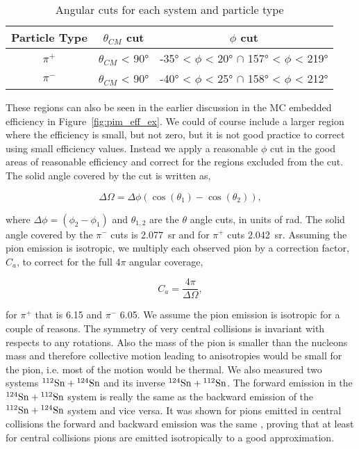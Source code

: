  \begin{table*}[!htb]
 \centering
{}
\begin{tabular}{@{}ccc@{}}\toprule 
Particle Type & $\theta_{CM}$ cut & $\phi$ cut  \\ [0.5ex] 
 \midrule
$\pi^+$  & $\theta_{CM}$ < \ang{90}   &  \ang{-35} < $\phi$ < \ang{20} $\cap$ \ang{157} < $\phi$ < \ang{219}  \\
$\pi^-$  & $\theta_{CM}$ < \ang{90}   &  \ang{-40} < $\phi$ < \ang{25} $\cap$ \ang{158} < $\phi$ < \ang{212}   \\
 \bottomrule
\end{tabular}
\caption{Angular cuts for each system and particle type}
\label{tb:anglecuts}
\end{table*}



These regions can also be seen in the earlier discussion in the MC embedded efficiency in Figure~\ref{fig:pim_eff_ex}.  We could of course include a larger region where the efficiency is small, but not zero, but it is not good practice to  correct using small efficiency values. Instead we apply a reasonable $\phi$ cut in the good areas of reasonable efficiency and correct for the regions excluded from the cut. The solid angle covered by the cut is written as,

\begin{equation}
\Delta\Omega = \Delta\phi(\cos(\theta_1) - \cos(\theta_2)),
\end{equation}

where $\Delta\phi = (\phi_2 - \phi_1)$  and $\theta_{1,2}$ are the $\theta$ angle cuts, in units of \si{\radian}. The solid angle covered by the $\pi^-$ cuts is \SI{2.077}{\steradian} and for $\pi^+$ cuts \SI{2.042}{\steradian}. Assuming the pion emission is isotropic, we multiply each observed pion by a correction factor, $C_a$, to correct for the full 4$\pi$ angular coverage, 

\begin{equation}
C_a = \frac{4\pi}{\Delta\Omega},
\label{eq:acceptCorrFactor}
\end{equation}

for $\pi^+$ that is \num{6.15} and $\pi^-$ \num{6.05}. We assume the pion emission is isotropic for a couple of reasons. The symmetry of very central collisions is invariant with respects to any rotations. Also the mass of the pion is smaller than the nucleons mass and therefore collective motion leading to anisotropies would be small for the pion, i.e. most of the motion would be thermal. We also measured two systems ${}^{112}\mathrm{Sn} + {}^{124}\mathrm{Sn}$ and its inverse ${}^{124}\mathrm{Sn} + {}^{112}\mathrm{Sn}$. The forward emission in the ${}^{124}\mathrm{Sn} + {}^{112}\mathrm{Sn}$ system is really the same as the backward emission of the ${}^{112}\mathrm{Sn} + {}^{124}\mathrm{Sn}$ system and vice versa. It was shown for pions emitted in central collisions the forward and backward emission was the same \cite{jon}, proving that at least for central collisions pions are emitted isotropically to a good approximation. 


